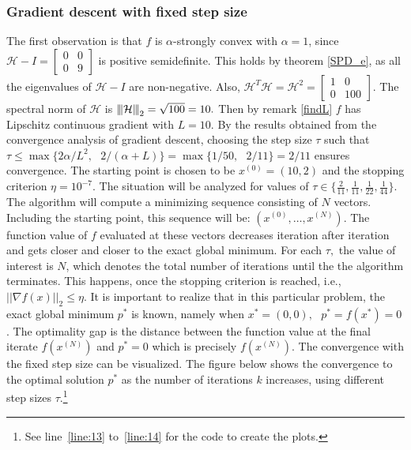 \subsubsection{Gradient descent with fixed step size}
The first observation is that $f$ is $\alpha$-strongly convex with $\alpha=1$, since $\mathcal{H} - I = \begin{bmatrix}
0 & 0 \\
0 & 9
\end{bmatrix}$ is positive semidefinite. This holds by theorem \ref{SPD_e}, as all the eigenvalues of $\mathcal{H} - I$ are non-negative. Also, $\mathcal{H}^{T}\mathcal{H} = \mathcal{H}^{2}= \begin{bmatrix}
1 & 0 \\
0 & 100
\end{bmatrix}$.
The spectral norm of $\mathcal{H}$ is ${\left\vert\kern-0.25ex\left\vert\kern-0.25ex\left\vert \mathcal{H} \right\vert\kern-0.25ex\right\vert\kern-0.25ex\right\vert}_{2} = \sqrt{100} = 10.$ Then by remark \ref{findL} $f$ has Lipschitz continuous gradient with $L=10.$ By the results obtained from the convergence analysis of gradient descent, choosing the step size $\tau$ such that $\tau \leq \max\{2\alpha / L^{2},\text{ } 2/(\alpha+L)\} = \max\{1/50,\text{ } 2/11\} = 2/11$ ensures convergence. The starting point is chosen to be $x^{(0)}=(10,2)$ and the stopping criterion $\eta = 10^{-7}.$ The situation will be analyzed for values of $\tau \in \{\frac{2}{11}, \frac{1}{11}, \frac{1}{22}, \frac{1}{44}\}.$ The algorithm will compute a minimizing sequence consisting of $N$ vectors. Including the starting point, this sequence will be: $(x^{(0)},\ldots,x^{(N)}).$ The function value of $f$ evaluated at these vectors decreases iteration after iteration and gets closer and closer to the exact global minimum. For each $\tau,$ the value of interest is $N$, which denotes the total number of iterations until the the algorithm terminates. This happens, once the stopping criterion is reached, i.e.,  $||\nabla f(x)||_{2} \leq \eta$. It is important to realize that in this particular problem, the exact global minimum $p^{*}$ is known, namely when $x^{*}=(0,0),\text{ } p^{*} = f(x^{*}) = 0$. The optimality gap is the distance between the function value at the final iterate $f(x^{(N)})$ and $p^{*} = 0$ which is precisely $f(x^{(N)}).$  The convergence with the fixed step size can be visualized. The figure below shows the convergence to the optimal solution $p^{*}$ as the number of iterations $k$ increases, using different step sizes $\tau$.\footnote{See line~\ref{line:13} to~\ref{line:14} for the code to create the plots.}
